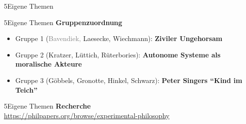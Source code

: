 \documentclass[xcolor=table,9pt,aspectratio=169]{beamer}
\begin{document}
\begin{frame}
\begin{overlayarea}{\textwidth}{0.81\paperheight}{
   \vspace*{11mm}
   \textcolor{uolblue}
   {5\hspace*{1em}Eigene Themen}
}
\end{overlayarea}
\end{frame}


\begin{frame}{\vspace*{10mm}5\hspace*{1em}Eigene Themen}
\textbf{Gruppenzuordnung}
   \begin{itemize}
      \item Gruppe 1 (\textcolor{gray}{Bavendiek,} Laesecke, Wiechmann): \textbf{Ziviler Ungehorsam}
      \item Gruppe 2 (Kratzer, Lüttich, Rüterbories): \textbf{Autonome Systeme als moralische Akteure}
      \item Gruppe 3 (Göbbels, Gronotte, Hinkel, Schwarz): \textbf{Peter Singers \enquote{Kind im Teich}}
   \end{itemize}
\end{frame}


\begin{frame}{\vspace*{10mm}5\hspace*{1em}Eigene Themen}
\textbf{Recherche}\\
\smallskip
\url{https://philpapers.org/browse/experimental-philosophy}

\bigskip
\begin{center}
   \\
\end{center}
\end{frame}
\end{document}
